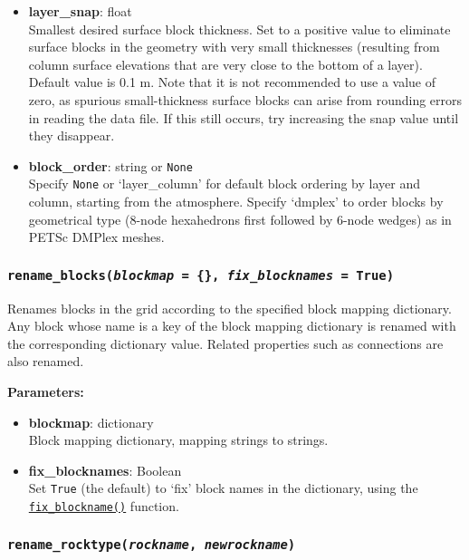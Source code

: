 \begin{itemize}
\item \textbf{layer\_snap}: float\\
  Smallest desired surface block thickness.  Set to a positive value to eliminate surface blocks in the geometry with very small thicknesses (resulting from column surface elevations that are very close to the bottom of a layer).  Default value is 0.1 m. Note that it is not recommended to use a value of zero, as spurious small-thickness surface blocks can arise from rounding errors in reading the data file. If this still occurs, try increasing the snap value until they disappear.
\item \textbf{block\_order}: string or \texttt{None}\\
  Specify \texttt{None} or `layer\_column' for default block ordering by layer and column, starting from the atmosphere. Specify `dmplex' to order blocks by geometrical type (8-node hexahedrons first followed by 6-node wedges) as in PETSc DMPlex meshes.
\end{itemize}

\begin{snugshade}
\subsubsection{\texttt{rename\_blocks(\emph{blockmap} = \{\}, \emph{fix\_blocknames} = True)}}
\end{snugshade}
\label{sec:t2grid:rename_blocks}

Renames blocks in the grid according to the specified block mapping dictionary. Any block whose name is a key of the block mapping dictionary is renamed with the corresponding dictionary value. Related properties such as connections are also renamed.

\textbf{Parameters:}
\begin{itemize}
\item \textbf{blockmap}: dictionary\\
  Block mapping dictionary, mapping strings to strings.
\item \textbf{fix\_blocknames}: Boolean\\
  Set \texttt{True} (the default) to `fix' block names in the dictionary, using the \hyperref[sec:mulgrid:fix_blockname]{\texttt{fix\_blockname()}} function. 
\end{itemize}

\begin{snugshade}
\subsubsection{\texttt{rename\_rocktype(\emph{rockname}, \emph{newrockname})}}
\end{snugshade}
\label{sec:t2grid:rename_rocktype}

